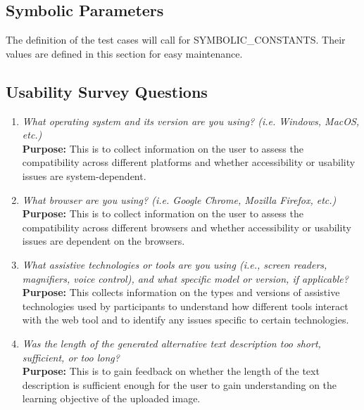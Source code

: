 \documentclass[12pt, titlepage]{article}
\begin{document}
\subsection{Symbolic Parameters}

The definition of the test cases will call for SYMBOLIC\_CONSTANTS.
Their values are defined in this section for easy maintenance.

\subsection{Usability Survey Questions}
\label{appendix:usability}

\begin{enumerate}[label=UA-Q \arabic*., wide=0pt, leftmargin=*]
  \item \emph{What operating system and its version are you using?
    (i.e. Windows, MacOS, etc.)}\\[2mm]
    {\bf Purpose:} This is to collect information on the user to assess
    the compatibility across different platforms and
    whether accessibility or usability issues are system-dependent.

  \item \emph{What browser are you using? (i.e. Google Chrome, Mozilla
    Firefox, etc.)}\\[2mm]
    {\bf Purpose:} This is to collect information on the user to assess
    the compatibility across different browsers and
    whether accessibility or usability issues are dependent on the browsers.

  \item \emph{What assistive technologies or tools are you using (i.e.,
      screen readers, magnifiers, voice control), and what specific model
    or version, if applicable?}\\[2mm]
    {\bf Purpose:} This collects information on the types and versions
    of assistive technologies used by participants to understand how
    different tools interact with the web tool
    and to identify any issues specific to certain technologies.

  \item \emph{Was the length of the generated alternative text
    description too short, sufficient, or too long?}\\[2mm]
    {\bf Purpose:} This is to gain feedback on whether the length of
    the text description is sufficient enough
    for the user to gain understanding on the learning objective of the
    uploaded image.


\end{enumerate}
\end{document}
